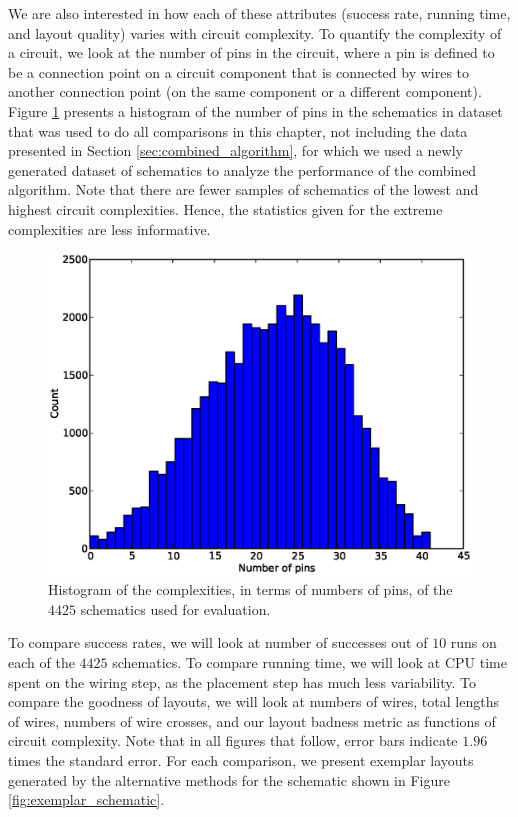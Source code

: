 We are also interested in how each of these attributes (success rate, running
time, and layout quality) varies with circuit complexity. To quantify
the complexity of a circuit, we look at the number of pins in the
circuit, where a pin is defined to be a connection point on a circuit
component that is connected by wires to another connection point (on the same
component or a different component). Figure
\ref{fig:complexity_hist} presents a histogram of the number of pins in the
schematics in dataset that was used to do all comparisons in this chapter,
not including the data presented in Section \ref{sec:combined_algorithm}, for
which we used a newly generated dataset of schematics to analyze the performance
of the combined algorithm. Note that there are fewer samples of schematics
of the lowest and highest circuit complexities. Hence, the statistics given
for the extreme complexities are less informative.

\begin{figure}[H]
\begin{center}
\includegraphics[width=\textwidth]{Images/complexity_hist.eps}
\caption[Schematic complexity histogram]{Histogram of the complexities, in terms
of numbers of pins, of the $4425$ schematics used for evaluation.}
\label{fig:complexity_hist}
\end{center}
\end{figure}

To compare success rates, we will look at number of successes out of $10$ runs
on each of the $4425$ schematics. To compare running time, we will look at CPU
time spent on the wiring step, as the placement step has much less variability.
To compare the goodness of layouts, we will look at numbers of wires, total
lengths of wires, numbers of wire crosses, and our layout badness metric as
functions of circuit complexity. Note that in all figures that follow,
error bars indicate $1.96$ times the standard error. For each comparison,
we present exemplar layouts generated by the alternative methods for the
schematic shown in Figure \ref{fig:exemplar_schematic}.

